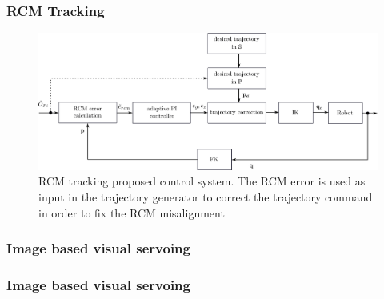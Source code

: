\begin{frame}
\frametitle{RCM Tracking}
\begin{center}
\begin{figure}[!htb]
\centering
\includegraphics[width=\textwidth]{../images/rcm-system-control.png}
\caption{RCM tracking proposed control system. The RCM error is used as input in the trajectory generator to correct the trajectory command in order to fix the RCM misalignment}
\label{rcm-control-system-block-diagram}
\end{figure}
\end{center}
\end{frame}


\begin{frame}
\frametitle{Image based visual servoing}
\end{frame}


\begin{frame}
\frametitle{Image based visual servoing}
\end{frame}
